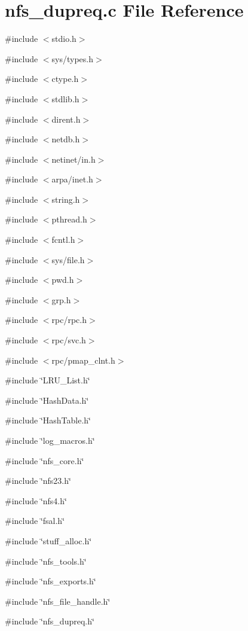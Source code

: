 \section{nfs\_\-dupreq.c File Reference}
\label{nfs__dupreq_8c}
{\ttfamily \#include $<$stdio.h$>$}\par
{\ttfamily \#include $<$sys/types.h$>$}\par
{\ttfamily \#include $<$ctype.h$>$}\par
{\ttfamily \#include $<$stdlib.h$>$}\par
{\ttfamily \#include $<$dirent.h$>$}\par
{\ttfamily \#include $<$netdb.h$>$}\par
{\ttfamily \#include $<$netinet/in.h$>$}\par
{\ttfamily \#include $<$arpa/inet.h$>$}\par
{\ttfamily \#include $<$string.h$>$}\par
{\ttfamily \#include $<$pthread.h$>$}\par
{\ttfamily \#include $<$fcntl.h$>$}\par
{\ttfamily \#include $<$sys/file.h$>$}\par
{\ttfamily \#include $<$pwd.h$>$}\par
{\ttfamily \#include $<$grp.h$>$}\par
{\ttfamily \#include $<$rpc/rpc.h$>$}\par
{\ttfamily \#include $<$rpc/svc.h$>$}\par
{\ttfamily \#include $<$rpc/pmap\_\-clnt.h$>$}\par
{\ttfamily \#include \char`\"{}LRU\_\-List.h\char`\"{}}\par
{\ttfamily \#include \char`\"{}HashData.h\char`\"{}}\par
{\ttfamily \#include \char`\"{}HashTable.h\char`\"{}}\par
{\ttfamily \#include \char`\"{}log\_\-macros.h\char`\"{}}\par
{\ttfamily \#include \char`\"{}nfs\_\-core.h\char`\"{}}\par
{\ttfamily \#include \char`\"{}nfs23.h\char`\"{}}\par
{\ttfamily \#include \char`\"{}nfs4.h\char`\"{}}\par
{\ttfamily \#include \char`\"{}fsal.h\char`\"{}}\par
{\ttfamily \#include \char`\"{}stuff\_\-alloc.h\char`\"{}}\par
{\ttfamily \#include \char`\"{}nfs\_\-tools.h\char`\"{}}\par
{\ttfamily \#include \char`\"{}nfs\_\-exports.h\char`\"{}}\par
{\ttfamily \#include \char`\"{}nfs\_\-file\_\-handle.h\char`\"{}}\par
{\ttfamily \#include \char`\"{}nfs\_\-dupreq.h\char`\"{}}\par
